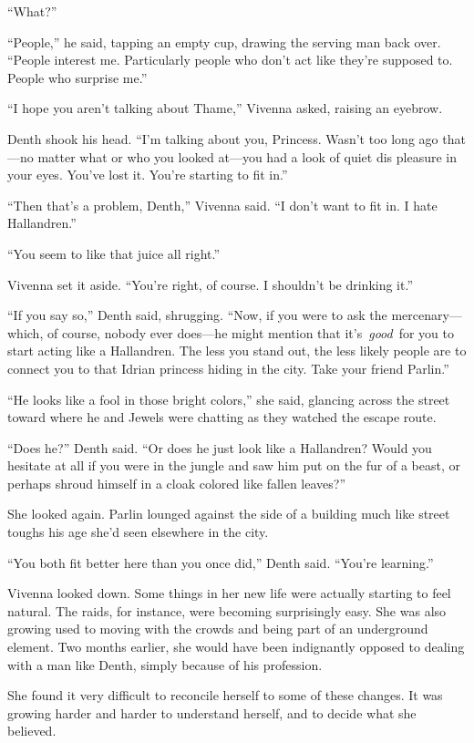 “What?”

“People,” he said, tapping an empty cup, drawing the serving man back over. “People interest me. Particularly people who don’t act like they’re supposed to. People who surprise me.”

“I hope you aren’t talking about Thame,” Vivenna asked, raising an eyebrow.

Denth shook his head. “I’m talking about you, Princess. Wasn’t too long ago that—no matter what or who you looked at—you had a look of quiet dis pleasure in your eyes. You’ve lost it. You’re starting to fit in.”

“Then that’s a problem, Denth,” Vivenna said. “I don’t want to fit in. I hate Hallandren.”

“You seem to like that juice all right.”

Vivenna set it aside. “You’re right, of course. I shouldn’t be drinking it.”

“If you say so,” Denth said, shrugging. “Now, if you were to ask the mercenary—which, of course, nobody ever does—he might mention that it’s~\textit{good}~for you to start acting like a Hallandren. The less you stand out, the less likely people are to connect you to that Idrian princess hiding in the city. Take your friend Parlin.”

“He looks like a fool in those bright colors,” she said, glancing across the street toward where he and Jewels were chatting as they watched the escape route.

“Does he?” Denth said. “Or does he just look like a Hallandren? Would you hesitate at all if you were in the jungle and saw him put on the fur of a beast, or perhaps shroud himself in a cloak colored like fallen leaves?”

She looked again. Parlin lounged against the side of a building much like street toughs his age she’d seen elsewhere in the city.

“You both fit better here than you once did,” Denth said. “You’re learning.”

Vivenna looked down. Some things in her new life were actually starting to feel natural. The raids, for instance, were becoming surprisingly easy. She was also growing used to moving with the crowds and being part of an underground element. Two months earlier, she would have been indignantly opposed to dealing with a man like Denth, simply because of his profession.

She found it very difficult to reconcile herself to some of these changes. It was growing harder and harder to understand herself, and to decide what she believed.

